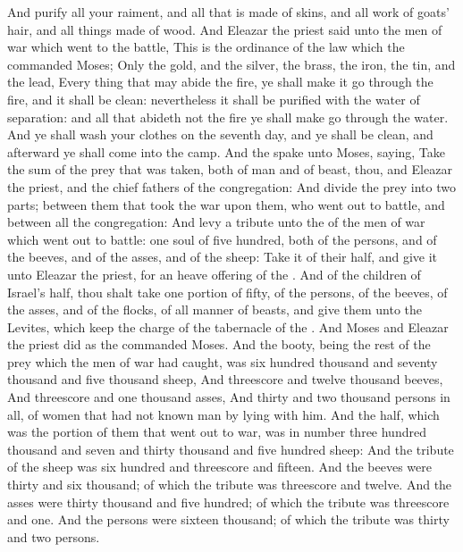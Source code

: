 \begin{biblechapter}
\verse And purify all your raiment, and all that is made of skins, and all work of goats' hair, and all things made of wood.
\verse And Eleazar the priest said unto the men of war which went to the battle, This is the ordinance of the law which the \LORD commanded Moses;
\verse Only the gold, and the silver, the brass, the iron, the tin, and the lead,
\verse Every thing that may abide the fire, ye shall make it go through the fire, and it shall be clean: nevertheless it shall be purified with the water of separation: and all that abideth not the fire ye shall make go through the water.
\verse And ye shall wash your clothes on the seventh day, and ye shall be clean, and afterward ye shall come into the camp.
 And the \LORD spake unto Moses, saying,
\verse Take the sum of the prey that was taken, both of man and of beast, thou, and Eleazar the priest, and the chief fathers of the congregation:
\verse And divide the prey into two parts; between them that took the war upon them, who went out to battle, and between all the congregation:
\verse And levy a tribute unto the \LORD of the men of war which went out to battle: one soul of five hundred, both of the persons, and of the beeves, and of the asses, and of the sheep:
\verse Take it of their half, and give it unto Eleazar the priest, for an heave offering of the \LORD.
\verse And of the children of Israel's half, thou shalt take one portion of fifty, of the persons, of the beeves, of the asses, and of the flocks, of all manner of beasts, and give them unto the Levites, which keep the charge of the tabernacle of the \LORD.
\verse And Moses and Eleazar the priest did as the \LORD commanded Moses.
\verse And the booty, being the rest of the prey which the men of war had caught, was six hundred thousand and seventy thousand and five thousand sheep,
\verse And threescore and twelve thousand beeves,
\verse And threescore and one thousand asses,
\verse And thirty and two thousand persons in all, of women that had not known man by lying with him.
\verse And the half, which was the portion of them that went out to war, was in number three hundred thousand and seven and thirty thousand and five hundred sheep:
\verse And the \LORDs tribute of the sheep was six hundred and threescore and fifteen.
\verse And the beeves were thirty and six thousand; of which the \LORDs tribute was threescore and twelve.
\verse And the asses were thirty thousand and five hundred; of which the \LORDs tribute was threescore and one.
\verse And the persons were sixteen thousand; of which the \LORDs tribute was thirty and two persons.

\end{biblechapter}
